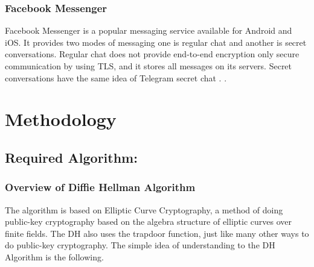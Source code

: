 \subsection{Facebook Messenger}
Facebook Messenger is a popular messaging service
available for Android and iOS. It provides two modes of
messaging one is regular chat and another is secret conversations.
Regular chat does not provide end-to-end encryption only
secure communication by using TLS,  and it stores all
messages on its servers. Secret conversations have  the
same idea of Telegram secret chat . .\cite{fb}




\chapter{Methodology}

\section{Required Algorithm:}

\subsection{Overview of  Diffie Hellman Algorithm}
The algorithm is based on Elliptic Curve Cryptography, a method of doing public-key cryptography based on the algebra structure of elliptic curves over finite fields. The DH also uses the trapdoor function, just like many other ways to do public-key cryptography. The simple idea of understanding to the DH Algorithm is the following.

